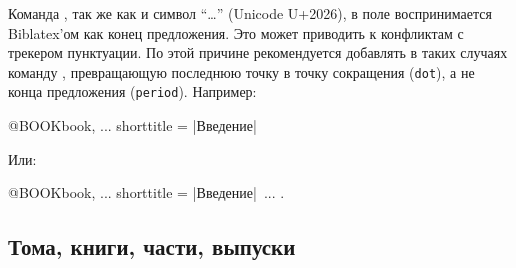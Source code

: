 \documentclass[10pt,a4paper,headings=small,numbers=enddot,english,russian]{ltxdockit}
\newcommand*{\biblatex}{Biblatex\xspace}
\newenvironment{bibexample}{\begin{list}
     {}
     {\setlength{\leftmargin}{\parindent}%
      \setlength{\itemindent}{-\leftmargin}%
      \setlength{\parsep}{0pt}}}
  {\end{list}}
\begin{document}
\begin{fieldlist}
Команда , так же как и символ \enquote{…} (Unicode U+2026), в поле  воспринимается \biblatex'ом
как конец предложения. Это может приводить к конфликтам с трекером пунктуации.
По этой причине рекомендуется добавлять в таких случаях
команду , превращающую
последнюю точку в точку сокращения (\texttt{dot}), а не конца предложения
(\texttt{period}). Например:

\begin{ltxcode}[escapechar=|]
@BOOK{book,
  ...
  shorttitle = {|Введение|~\textellipsis\isdot}
}
\end{ltxcode}

Или:

\begin{ltxcode}[escapechar=|]
@BOOK{book,
  ...
  shorttitle = {|Введение|~...\isdot}
}.
\end{ltxcode}

\end{fieldlist}


%
%

\subsection{Тома, книги, части, выпуски}
\label{sec:volsparts}
\end{document}
